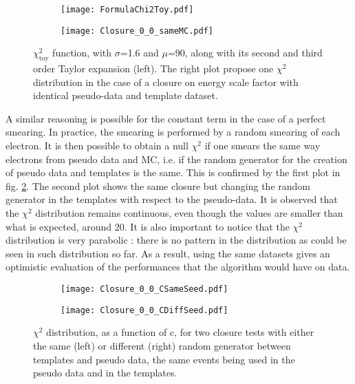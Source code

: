 \begin{enumerate}
\begin{figure}
\begin{subfigure}[t]{0.49\linewidth}
\begin{center}
\texttt{[image: FormulaChi2Toy.pdf]}
\end{center}
\end{subfigure}
\begin{subfigure}[t]{0.49\linewidth}
\begin{center}
\texttt{[image: Closure\_0\_0\_sameMC.pdf]}
\end{center}
\end{subfigure}
\caption{\label{org0c951ba}
\(\chi^{\text{2}}_{\text{toy}}\) function, with \(\sigma\)=1.6 and \(\mu\)=90, along with its second and third order Taylor expansion (left). The right plot propose one $\chi^2$ distribution in the case of a closure on energy scale factor with identical pseudo-data and template dataset.}
\end{figure}

A similar reasoning is possible for the constant term in the case of a perfect smearing.
In practice, the smearing is performed by a random smearing of each electron.
It is then possible to obtain a null $\chi^2$ if one smears the same way electrons from pseudo data and MC, i.e. if the random generator for the creation of pseudo data and templates is the same.
This is confirmed by the first plot in fig. \ref{orgf0c9faa}.
The second plot shows the same closure but changing the random generator in the templates with respect to the pseudo-data.
It is observed that the $\chi^2$ distribution remains continuous, even though the values are smaller than what is expected, around 20.
It is also important to notice that the $\chi^2$ distribution is very parabolic : there is no pattern in the distribution as could be seen in such distribution so far.
As a result, using the same datasets gives an optimistic evaluation of the performances that the algorithm would have on data.


\begin{figure}
\begin{subfigure}[t]{0.49\linewidth}
\begin{center}
\texttt{[image: Closure\_0\_0\_CSameSeed.pdf]}
\end{center}
\end{subfigure}
\begin{subfigure}[t]{0.49\linewidth}
\begin{center}
\texttt{[image: Closure\_0\_0\_CDiffSeed.pdf]}
\end{center}
\end{subfigure}
\caption{\label{orgf0c9faa}
$\chi^2$ distribution, as a function of c, for two closure tests with either the same (left) or different (right) random generator between templates and pseudo data, the same events being used in the pseudo data and in the templates.}
\end{figure}





\end{enumerate}

